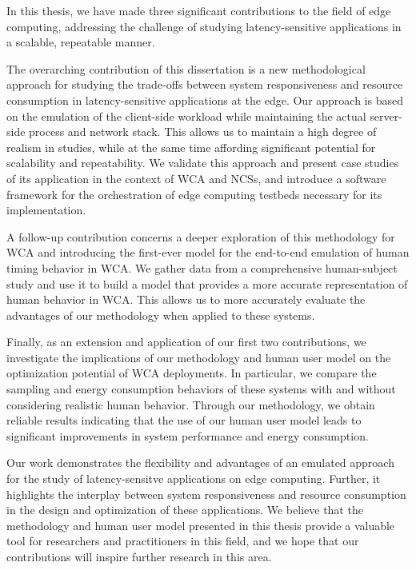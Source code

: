 In this thesis, we have made three significant contributions to the field of edge computing, addressing the challenge of studying latency-sensitive applications in a scalable, repeatable manner.

The overarching contribution of this dissertation is a new methodological approach for studying the trade-offs between system responsiveness and resource consumption in latency-sensitive applications at the edge.
Our approach is based on the emulation of the client-side workload while maintaining the actual server-side process and network stack.
This allows us to maintain a high degree of realism in studies, while at the same time affording significant potential for scalability and repeatability.
We validate this approach and present case studies of its application in the context of \gls{WCA} and \glspl{NCS}, and introduce a software framework for the orchestration of edge computing testbeds necessary for its implementation.

A follow-up contribution concerns a deeper exploration of this methodology for \gls{WCA} and introducing the first-ever model for the end-to-end emulation of human timing behavior in \gls{WCA}.
We gather data from a comprehensive human-subject study and use it to build a model that provides a more accurate representation of human behavior in \gls{WCA}.
This allows us to more accurately evaluate the advantages of our methodology when applied to these systems.

Finally, as an extension and application of our first two contributions, we investigate the implications of our methodology and human user model on the optimization potential of \gls{WCA} deployments.
In particular, we compare the sampling and energy consumption behaviors of these systems with and without considering realistic human behavior.
Through our methodology, we obtain reliable results indicating that the use of our human user model leads to significant improvements in system performance and energy consumption.

Our work demonstrates the flexibility and advantages of an emulated approach for the study of latency-sensitve applications on edge computing.
Further, it highlights the interplay between system responsiveness and resource consumption in the design and optimization of these applications.
We believe that the methodology and human user model presented in this thesis provide a valuable tool for researchers and practitioners in this field, and we hope that our contributions will inspire further research in this area.
